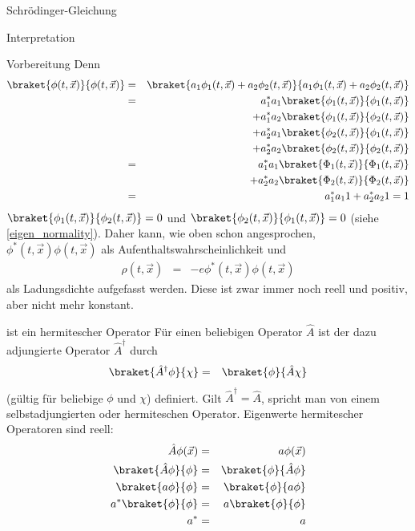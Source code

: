 \begin{chapter}{\titlestr}
\begin{section}{Schrödinger-Gleichung}
\begin{subsection}{Interpretation}
\begin{subsubsection}{Vorbereitung}
Denn
\begin{eqnarray*}
\braket{\phi(t,\vec{x})}{\phi(t,\vec{x})} &=& \braket{a_1\phi_1(t,\vec{x})+a_2\phi_2(t,\vec{x})}{a_1\phi_1(t,\vec{x})+a_2\phi_2(t,\vec{x})}\\
&=&a_1^*a_1\braket{\phi_1(t,\vec{x})}{\phi_1(t,\vec{x})}\\
&&+a_1^*a_2\braket{\phi_1(t,\vec{x})}{\phi_2(t,\vec{x})}\\
&&+a_2^*a_1\braket{\phi_2(t,\vec{x})}{\phi_1(t,\vec{x})}\\
&&+a_2^*a_2\braket{\phi_2(t,\vec{x})}{\phi_2(t,\vec{x})}\\
&=&a_1^*a_1\braket{\Phi_1(t,\vec{x})}{\Phi_1(t,\vec{x})}\\
&&+a_2^*a_2\braket{\Phi_2(t,\vec{x})}{\Phi_2(t,\vec{x})}\\
&=&a_1^*a_11+a_2^*a_21 = 1
\end{eqnarray*}
$\braket{\phi_1(t,\vec{x})}{\phi_2(t,\vec{x})}=0$ und $\braket{\phi_2(t,\vec{x})}{\phi_1(t,\vec{x})}=0$ (siehe \ref{eigen_normality}).
Daher kann, wie oben schon angesprochen, $\phi^*(t,\vec{x})\phi(t,\vec{x})$ als Aufenthaltswahrscheinlichkeit und
\begin{eqnarray*}
\rho(t,\vec{x}) &=& -e\phi^*(t,\vec{x})\phi(t,\vec{x})
\end{eqnarray*}
als Ladungsdichte aufgefasst werden. Diese ist zwar immer noch reell und positiv, aber nicht mehr konstant.
\end{subsubsection}

\begin{subsubsection}{ ist ein hermitescher Operator}
Für einen beliebigen Operator $\hat{A}$ ist der dazu adjungierte Operator $\hat{A}^\dagger$ durch
\begin{eqnarray*}
\braket{\hat{A}^\dagger \phi}{\chi} &=& \braket{\phi}{\hat{A}\chi}
\end{eqnarray*}
(gültig für beliebige $\phi$ und $\chi$) definiert. Gilt $\hat{A}^\dagger = \hat{A}$, spricht man von einem selbstadjungierten oder hermiteschen Operator. Eigenwerte hermitescher Operatoren sind reell:
\begin{eqnarray*}
\hat{A}\phi(\vec{x}) &=& a\phi(\vec{x})\\
\braket{\hat{A}\phi}{\phi} &=& \braket{\phi}{\hat{A}\phi}\\
\braket{a\phi}{\phi} &=& \braket{\phi}{a\phi}\\
a^*\braket{\phi}{\phi} &=& a\braket{\phi}{\phi}\\
a^* &=& a
\end{eqnarray*}



\end{subsubsection}
\end{subsection}
\end{section}
\end{chapter}
